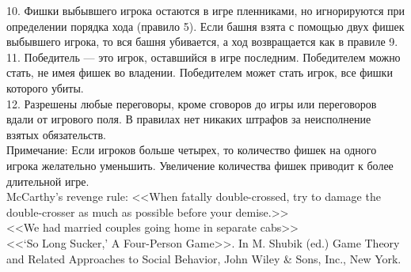 \begin{problem} 
10. Фишки выбывшего игрока остаются в игре пленниками, но игнорируются при определении порядка хода (правило 5). Если башня взята с помощью двух фишек выбывшего игрока, то вся башня убивается, а ход возвращается как в правиле 9.\\
11. Победитель --- это игрок, оставшийся в игре последним. Победителем можно стать, не имея фишек во владении. Победителем может стать игрок, все фишки которого убиты.\\
12. Разрешены любые переговоры, кроме сговоров до игры или переговоров вдали от игрового поля. В правилах нет никаких штрафов за неисполнение взятых обязательств.\\
Примечание: Если игроков больше четырех, то количество фишек на одного игрока желательно уменьшить. Увеличение количества фишек приводит к более длительной игре.\\
McCarthy's revenge rule: <<When fatally double-crossed, try to damage the double-crosser as much as possible before your demise.>>\\
<<We had married couples going home in separate cabs>>\\
<<`So Long Sucker,' A Four-Person Game>>. In M. Shubik (ed.) Game Theory and Related Approaches to Social Behavior, John Wiley \& Sons, Inc., New York.



\begin{sol}

\end{sol}
\end{problem}






